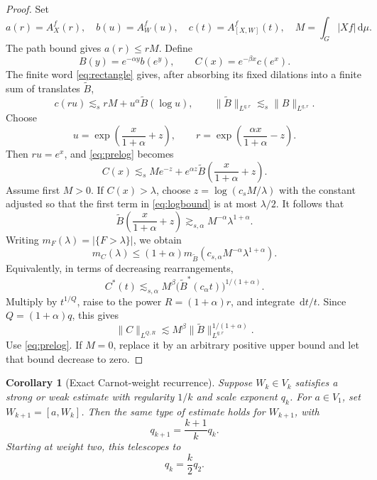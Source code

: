 \documentclass[11pt]{article}
\newtheorem{corollary}[theorem]{Corollary}
\theoremstyle{definition}
\theoremstyle{remark}
\newcommand{\dd}{\,\mathrm d}
\newcommand{\abs}[1]{\lvert #1\rvert}
\newcommand{\norm}[1]{\lVert #1\rVert}
\newcommand{\A}[2]{A_{#1}^{#2}}
\newcommand{\less}{\lesssim}
\begin{document}
\begin{proof}
Set
\[
 a(r)=\A{X}{f}(r),\quad b(u)=\A{W}{f}(u),\quad
 c(t)=\A{[X,W]}{f}(t),\quad M=\int_G\abs{Xf}\dd\mu.
\]
The path bound gives \(a(r)\le rM\).  Define
\[
 B(y)=e^{-\alpha y}b(e^y),\qquad C(x)=e^{-\beta x}c(e^x).
\]
The finite word \eqref{eq:rectangle} gives, after absorbing its fixed dilations into a
finite sum of translates \(\widetilde B\),
\begin{equation}\label{eq:prelog}
 c(ru)\less_s rM+u^\alpha\widetilde B(\log u),
 \qquad
 \norm{\widetilde B}_{L^{q,r}}\less_s\norm{B}_{L^{q,r}}.
\end{equation}
Choose
\[
 u=\exp\left(\frac{x}{1+\alpha}+z\right),\qquad
 r=\exp\left(\frac{\alpha x}{1+\alpha}-z\right).
\]
Then \(ru=e^x\), and \eqref{eq:prelog} becomes
\begin{equation}\label{eq:logbound}
 C(x)\less_s Me^{-z}+e^{\alpha z}
 \widetilde B\left(\frac{x}{1+\alpha}+z\right).
\end{equation}
Assume first \(M>0\).  If \(C(x)>\lambda\), choose
\(z=\log(c_sM/\lambda)\) with the constant adjusted so that the first term in
\eqref{eq:logbound} is at most \(\lambda/2\).  It follows that
\[
 \widetilde B\left(\frac{x}{1+\alpha}+z\right)
 \gtrsim_{s,\alpha}M^{-\alpha}\lambda^{1+\alpha}.
\]
Writing \(m_F(\lambda)=\abs{\{F>\lambda\}}\), we obtain
\begin{equation}\label{eq:distribution}
 m_C(\lambda)\le(1+\alpha)
 m_{\widetilde B}(c_{s,\alpha}M^{-\alpha}\lambda^{1+\alpha}).
\end{equation}
Equivalently, in terms of decreasing rearrangements,
\begin{equation}\label{eq:rearrangement}
 C^*(t)\less_{s,\alpha}M^\beta
 \bigl(\widetilde B^*(c_\alpha t)\bigr)^{1/(1+\alpha)}.
\end{equation}
Multiply by \(t^{1/Q}\), raise to the power
\(R=(1+\alpha)r\), and integrate \(\dd t/t\).  Since
\(Q=(1+\alpha)q\), this gives
\[
 \norm{C}_{L^{Q,R}}
 \less M^\beta\norm{\widetilde B}_{L^{q,r}}^{1/(1+\alpha)}.
\]
Use \eqref{eq:prelog}.  If \(M=0\), replace it by an arbitrary positive upper bound and
let that bound decrease to zero.
\end{proof}

\begin{corollary}[Exact Carnot-weight recurrence]\label{cor:recurrence}
Suppose \(W_k\in V_k\) satisfies a strong or weak estimate with regularity \(1/k\) and
scale exponent \(q_k\).  For \(a\in V_1\), set \(W_{k+1}=[a,W_k]\).  Then the same type
of estimate holds for \(W_{k+1}\), with
\begin{equation}\label{eq:recurrence}
 q_{k+1}=\frac{k+1}{k}q_k.
\end{equation}
Starting at weight two, this telescopes to
\begin{equation}\label{eq:qk}
 q_k=\frac{k}{2}q_2.
\end{equation}
\end{corollary}
\end{document}
